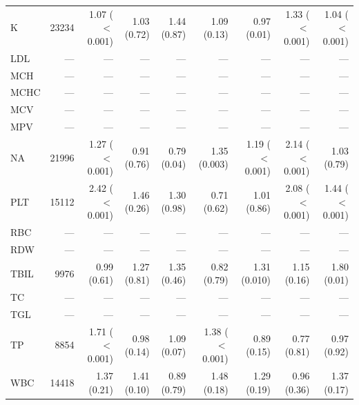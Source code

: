 \begin{table}[ht]
\begin{tabular}{lrrrrrrrr}
K & 23234 & 1.07 ($<$0.001) & 1.03 (0.72) & 1.44 (0.87) & 1.09 (0.13) & 0.97 (0.01) & 1.33 ($<$0.001) & 1.04 ($<$0.001) \\
LDL & --- & --- & --- & --- & --- & --- & --- & --- \\
MCH & --- & --- & --- & --- & --- & --- & --- & --- \\
MCHC & --- & --- & --- & --- & --- & --- & --- & --- \\
MCV & --- & --- & --- & --- & --- & --- & --- & --- \\
MPV & --- & --- & --- & --- & --- & --- & --- & --- \\
NA & 21996 & 1.27 ($<$0.001) & 0.91 (0.76) & 0.79 (0.04) & 1.35 (0.003) & 1.19 ($<$0.001) & 2.14 ($<$0.001) & 1.03 (0.79) \\
PLT & 15112 & 2.42 ($<$0.001) & 1.46 (0.26) & 1.30 (0.98) & 0.71 (0.62) & 1.01 (0.86) & 2.08 ($<$0.001) & 1.44 ($<$0.001) \\
RBC & --- & --- & --- & --- & --- & --- & --- & --- \\
RDW & --- & --- & --- & --- & --- & --- & --- & --- \\
TBIL & 9976 & 0.99 (0.61) & 1.27 (0.81) & 1.35 (0.46) & 0.82 (0.79) & 1.31 (0.010) & 1.15 (0.16) & 1.80 (0.01) \\
TC & --- & --- & --- & --- & --- & --- & --- & --- \\
TGL & --- & --- & --- & --- & --- & --- & --- & --- \\
TP & 8854 & 1.71 ($<$0.001) & 0.98 (0.14) & 1.09 (0.07) & 1.38 ($<$0.001) & 0.89 (0.15) & 0.77 (0.81) & 0.97 (0.92) \\
WBC & 14418 & 1.37 (0.21) & 1.41 (0.10) & 0.89 (0.79) & 1.48 (0.18) & 1.29 (0.19) & 0.96 (0.36) & 1.37 (0.17) \\
\bottomrule
\end{tabular}
\label{tab:17_incidence_inspire_mortality}
\end{table}